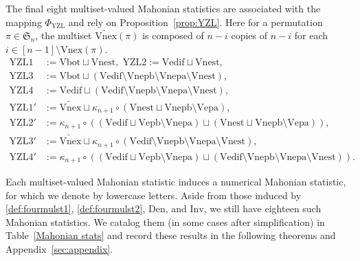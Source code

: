 \documentclass[12pt]{amsart}
\numberwithin{equation}{section}
\theoremstyle{plain}
\theoremstyle{definition}
\def\YZL{\mathrm{YZL}}
\def\SS{\mathfrak{S}}
\def\Vnexpb{\mathrm{Vnepb}}
\def\Vnexpa{\mathrm{Vnepa}}
\def\Vexpb{\mathrm{Vepb}}
\def\Vexpa{\mathrm{Vepa}}
\def\Vedif{\mathrm{Vedif}}
\def\Vbot{\mathrm{Vbot}}
\def\Vnex{\mathrm{Vnex}}
\def\Vnest{\mathrm{Vnest}}
\def\Inv{\mathrm{Inv}}
\def\Den{\mathrm{Den}}
\def\YZLone{\mathrm{YZL1}}
\def\YZLtwo{\mathrm{YZL2}}
\def\YZLthree{\mathrm{YZL3}}
\def\YZLfour{\mathrm{YZL4}}
\begin{document}
The final eight multiset-valued Mahonian statistics are associated with the mapping $\Phi_{\YZL}$ and rely on Proposition~\ref{prop:YZL}. Here for a permutation $\pi\in\SS_n$, the multiset $\widetilde{\Vnex}(\pi)$ is composed of $n-i$ copies of $n-i$ for each $i\in[n-1]\setminus\Vnex(\pi)$.
\begin{align*}
\YZLone &:=\Vbot \sqcup \Vnest, \; \YZLtwo :=\Vedif \sqcup \Vnest, \\
\YZLthree &:=\Vbot \sqcup (\Vedif \setminus\Vnexpb\setminus\Vnexpa\setminus\Vnest),\\
\YZLfour &:=\Vedif \sqcup (\Vedif \setminus\Vnexpb\setminus\Vnexpa\setminus\Vnest), \\
  \YZLone' &:=\widetilde{\Vnex} \sqcup
\kappa_{n+1}\circ(\Vnest \sqcup\Vnexpb \setminus \Vexpa), \\
  \YZLtwo' &:=\kappa_{n+1}\circ((\Vedif \sqcup\Vexpb \setminus \Vnexpa) \sqcup (\Vnest \sqcup\Vnexpb \setminus \Vexpa)), \\
  \YZLthree' &:=\widetilde{\Vnex} \sqcup
   \kappa_{n+1}\circ(\Vedif \setminus\Vnexpb\setminus\Vnexpa\setminus\Vnest), \\
  \YZLfour' &:=\kappa_{n+1}\circ((\Vedif \sqcup\Vexpb \setminus \Vnexpa) \sqcup (\Vedif \setminus\Vnexpb\setminus\Vnexpa\setminus\Vnest)).
\end{align*}





Each multiset-valued Mahonian statistic induces a numerical Mahonian statistic, for which we denote by lowercase letters. Aside from those induced by \eqref{def:fourmulst1}, \eqref{def:fourmulst2}, $\Den$, and $\Inv$, we still have eighteen such Mahonian statistics. We catalog them (in some cases after simplification) in Table~\ref{Mahonian stats} and record these results in the following theorems and Appendix~\ref{sec:appendix}.
\end{document}
